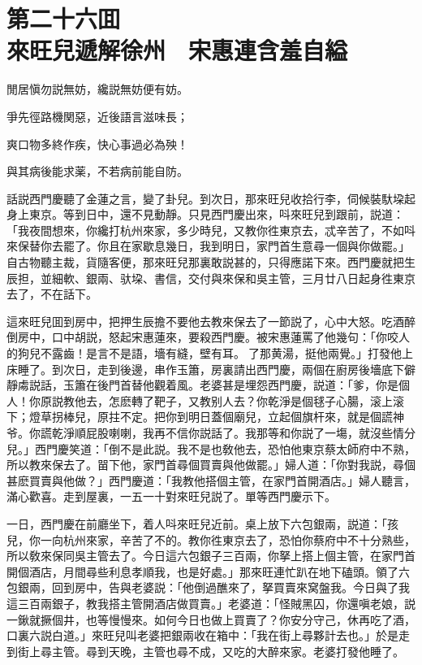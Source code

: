 
\chapter*{第二十六囬　\\來旺兒遞解徐州　宋惠連含羞自縊}


\begin{myquote}
閒居愼勿説無妨，纔説無妨便有妨。

爭先徑路機関惡，近後語言滋味長；

爽口物多終作疾，快心事過必為殃！

與其病後能求薬，不若病前能自防。
\end{myquote}

話説西門慶聽了金蓮之言，變了卦兒。到次日，那來旺兒收拾行李，伺候裝馱垜起身上東京。等到日中，還不見動靜。只見西門慶出來，呌來旺兒到跟前，説道：「我夜間想來，你纔打杭州來家，多少時兒，又教你徃東京去，忒辛苦了，不如呌來保替你去罷了。你且在家歇息幾日，我到明日，家門首生意尋一個與你做罷。」自古物聽主裁，貨隨客便，那來旺兒那裏敢説甚的，只得應諾下來。西門慶就把生辰担，並細軟、銀兩、驮垜、書信，交付與來保和吳主管，三月廿八日起身徃東京去了，不在話下。

這來旺兒囬到房中，把押生辰擔不要他去教來保去了一節説了，心中大怒。吃酒醉倒房中，口中胡説，怒起宋惠蓮來，要殺西門慶。被宋惠蓮罵了他幾句：「你咬人的狗兒不露齒！是言不是語，墻有縫，壁有耳。𠳹了那黄湯，挺他兩覺。」打發他上床睡了。到次日，走到後邊，串作玉簫，房裏請出西門慶，兩個在廚房後墻底下僻靜䖏説話，玉簫在後門首替他觀着風。老婆甚是埋怨西門慶，説道：「爹，你是個人！你原説教他去，怎麽轉了靶子，又教别人去？你乾淨是個毬子心腸，滚上滚下；燈草拐棒兒，原拄不定。把你到明日蓋個廟兒，立起個旗杆來，就是個謊神爷。你謊乾淨順屁股喇喇，我再不信你説話了。我那等和你説了一塲，就沒些情分兒。」西門慶笑道：「倒不是此説。我不是也敎他去，恐怕他東京蔡太師府中不熟，所以教來保去了。㽞下他，家門首尋個買賣與他做罷。」婦人道：「你對我説，尋個甚麽買賣與他做？」西門慶道：「我教他搭個主管，在家門首開酒店。」婦人聽言，滿心歡喜。走到屋裏，一五一十對來旺兒説了。單等西門慶示下。

一日，西門慶在前廳坐下，着人呌來旺兒近前。桌上放下六包銀兩，説道：「孩兒，你一向杭州來家，辛苦了不的。教你徃東京去了，恐怕你蔡府中不十分熟些，所以敎來保同吳主管去了。今日這六包銀子三百兩，你拏上搭上個主管，在家門首開個酒店，月間尋些利息孝順我，也是好處。」那來旺連忙趴在地下磕頭。領了六包銀兩，回到房中，告與老婆説：「他倒過醮來了，拏買賣來窝盤我。今日與了我這三百兩銀子，教我搭主管開酒店做買賣。」老婆道：「怪賊黑囚，你還嗔老娘，説一鍬就撅個井，也等慢慢來。如何今日也做上買賣了？你安分守己，休再吃了酒，口裏六説白道。」來旺兒叫老婆把銀兩收在箱中：「我在街上尋夥計去也。」於是走到街上尋主管。尋到天晚，主管也尋不成，又吃的大醉來家。老婆打發他睡了。

